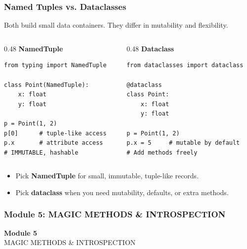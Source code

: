 \documentclass[aspectratio=169,10pt]{beamer}
\newcommand{\keyword}[1]{\textcolor{PrimaryBlue}{\textbf{#1}}}
\begin{document}
\begin{frame}[fragile]
\frametitle{Named Tuples vs. Dataclasses}
\small
Both build small data containers. They differ in mutability and flexibility.

\vspace{0.12cm}
\begin{columns}[T,totalwidth=0.98\textwidth]
\begin{column}{0.48\textwidth}
\textbf{NamedTuple}
\begin{lstlisting}[style=pycodesmall]
from typing import NamedTuple

class Point(NamedTuple):
    x: float
    y: float

p = Point(1, 2)
p[0]      # tuple-like access
p.x       # attribute access
# IMMUTABLE, hashable
\end{lstlisting}
\end{column}
\begin{column}{0.48\textwidth}
\textbf{Dataclass}
\begin{lstlisting}[style=pycodesmall]
from dataclasses import dataclass

@dataclass
class Point:
    x: float
    y: float

p = Point(1, 2)
p.x = 5     # mutable by default
# Add methods freely
\end{lstlisting}
\end{column}
\end{columns}

\vspace{0.1cm}
\begin{tcolorbox}[lecturebox,title=Choosing the right tool]
\begin{itemize}\setlength\itemsep{0.04cm}
  \item Pick \keyword{NamedTuple} for small, immutable, tuple-like records.
  \item Pick \keyword{dataclass} when you need mutability, defaults, or extra methods.
\end{itemize}
\end{tcolorbox}
\end{frame}


\begin{noheadline}
\begin{frame}
\frametitle{Module 5: MAGIC METHODS \& INTROSPECTION}
\vspace{1.2cm}
\begin{center}
  {\fontsize{30}{36}\selectfont\textbf{Module 5}}\\[0.35cm]
  {\fontsize{22}{28}\selectfont MAGIC METHODS \& INTROSPECTION}\\[0.7cm]
\end{center}
\end{frame}
\end{noheadline}
\end{document}
